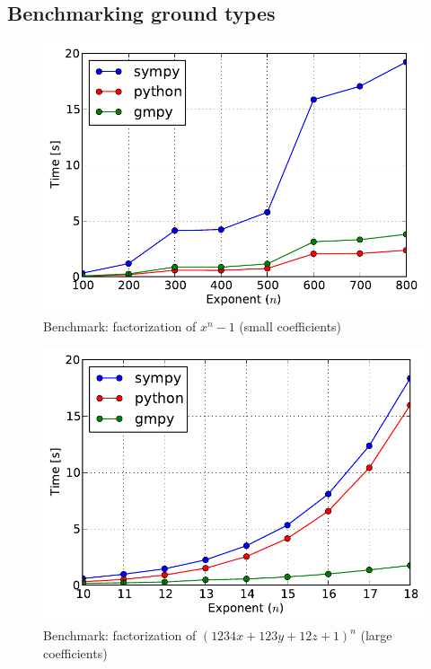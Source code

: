 \subsection{Benchmarking ground types}
\begin{figure}[htbp]
\centering

\includegraphics{ground-factor-small.pdf}
\caption{Benchmark: factorization of $x^n - 1$ (small coefficients)\label{fig-ground-factor-small}}\end{figure}
\begin{figure}[htbp]
\centering

\includegraphics{ground-factor-large.pdf}
\caption{Benchmark: factorization of $(1234 x + 123 y + 12 z + 1)^n$ (large coefficients)\label{fig-ground-factor-large}}\end{figure}



